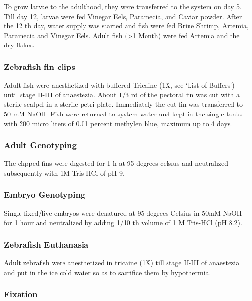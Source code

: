 \documentclass[11pt,singlespacinge,twoside]{reedthesis} %
\begin{document}
To grow larvae to the adulthood, they were transferred to the system on day 5. Till day 12, larvae were fed Vinegar Eels, Paramecia, and Caviar powder. After the 12 th day, water supply was started and fish were fed Brine Shrimp, Artemia, Paramecia and Vinegar Eels. Adult fish (\textgreater{}1 Month) were fed Artemia and the dry flakes.

\hypertarget{zebrafish-fin-clips}{%
\subsubsection{Zebrafish fin clips}\label{zebrafish-fin-clips}}

Adult fish were anesthetized with buffered Tricaine (1X, see `List of Buffers') until stage II-III of anaestezia. About 1/3 rd of the pectoral fin was cut with a sterile scalpel in a sterile petri plate. Immediately the cut fin was transferred to 50 mM NaOH. Fish were returned to system water and kept in the single tanks with 200 micro liters of 0.01 percent methylen blue, maximum up to 4 days.

\hypertarget{adult-genotyping}{%
\subsubsection{Adult Genotyping}\label{adult-genotyping}}

The clipped fins were digested for 1 h at 95 degrees celsius and neutralized subsequently with 1M Tris-HCl of pH 9.

\hypertarget{embryo-genotyping}{%
\subsubsection{Embryo Genotyping}\label{embryo-genotyping}}

Single fixed/live embryos were denatured at 95 degrees Celsius in 50mM NaOH for 1 hour and neutralized by adding 1/10 th volume of 1 M Tris-HCl (pH 8.2).

\hypertarget{zebrafish-euthanasia}{%
\subsubsection{Zebrafish Euthanasia}\label{zebrafish-euthanasia}}

Adult zebrafish were anesthetized in tricaine (1X) till stage II-III of anaestezia and put in the ice cold water so as to sacrifice them by hypothermia.

\hypertarget{fixation}{%
\subsubsection{Fixation}\label{fixation}}
\end{document}
